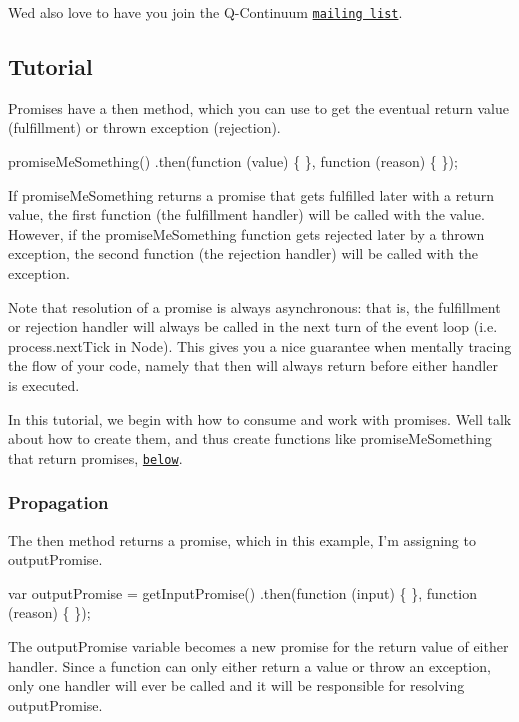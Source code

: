 We\textquotesingle{}d also love to have you join the Q-\/\+Continuum \href{https://groups.google.com/forum/#!forum/q-continuum}{\tt mailing list}.

\subsection*{Tutorial}

Promises have a {\ttfamily then} method, which you can use to get the eventual return value (fulfillment) or thrown exception (rejection).


\begin{DoxyCode}
promiseMeSomething()
.then(function (value) \{
\}, function (reason) \{
\});
\end{DoxyCode}


If {\ttfamily promise\+Me\+Something} returns a promise that gets fulfilled later with a return value, the first function (the fulfillment handler) will be called with the value. However, if the {\ttfamily promise\+Me\+Something} function gets rejected later by a thrown exception, the second function (the rejection handler) will be called with the exception.

Note that resolution of a promise is always asynchronous\+: that is, the fulfillment or rejection handler will always be called in the next turn of the event loop (i.\+e. {\ttfamily process.\+next\+Tick} in Node). This gives you a nice guarantee when mentally tracing the flow of your code, namely that {\ttfamily then} will always return before either handler is executed.

In this tutorial, we begin with how to consume and work with promises. We\textquotesingle{}ll talk about how to create them, and thus create functions like {\ttfamily promise\+Me\+Something} that return promises, \href{#the-beginning}{\tt below}.

\subsubsection*{Propagation}

The {\ttfamily then} method returns a promise, which in this example, I’m assigning to {\ttfamily output\+Promise}.


\begin{DoxyCode}
var outputPromise = getInputPromise()
.then(function (input) \{
\}, function (reason) \{
\});
\end{DoxyCode}


The {\ttfamily output\+Promise} variable becomes a new promise for the return value of either handler. Since a function can only either return a value or throw an exception, only one handler will ever be called and it will be responsible for resolving {\ttfamily output\+Promise}.


